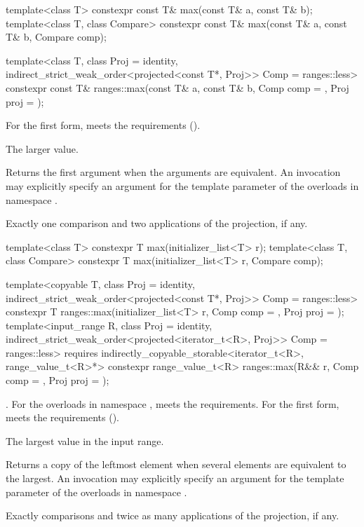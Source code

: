 %
\begin{itemdecl}
template<class T>
  constexpr const T& max(const T& a, const T& b);
template<class T, class Compare>
  constexpr const T& max(const T& a, const T& b, Compare comp);

template<class T, class Proj = identity,
         indirect_strict_weak_order<projected<const T*, Proj>> Comp = ranges::less>
  constexpr const T& ranges::max(const T& a, const T& b, Comp comp = {}, Proj proj = {});
\end{itemdecl}

\begin{itemdescr}
\pnum
\expects
For the first form,  meets the
 requirements ().

\pnum
\returns
The larger value.

\pnum
\remarks
Returns the first argument when the arguments are equivalent.
An invocation may explicitly specify
an argument for the template parameter 
of the overloads in namespace .

\pnum
\complexity
Exactly one comparison and two applications of the projection, if any.
\end{itemdescr}

%
\begin{itemdecl}
template<class T>
  constexpr T max(initializer_list<T> r);
template<class T, class Compare>
  constexpr T max(initializer_list<T> r, Compare comp);

template<copyable T, class Proj = identity,
         indirect_strict_weak_order<projected<const T*, Proj>> Comp = ranges::less>
  constexpr T ranges::max(initializer_list<T> r, Comp comp = {}, Proj proj = {});
template<input_range R, class Proj = identity,
         indirect_strict_weak_order<projected<iterator_t<R>, Proj>> Comp = ranges::less>
  requires indirectly_copyable_storable<iterator_t<R>, range_value_t<R>*>
  constexpr range_value_t<R>
    ranges::max(R&& r, Comp comp = {}, Proj proj = {});
\end{itemdecl}

\begin{itemdescr}
\pnum
\expects
{}.
For the overloads in namespace ,
 meets the  requirements.
For the first form,  meets the 
requirements ().

\pnum
\returns
The largest value in the input range.

\pnum
\remarks
Returns a copy of the leftmost element
when several elements are equivalent to the largest.
An invocation may explicitly specify
an argument for the template parameter 
of the overloads in namespace .

\pnum
\complexity
Exactly  comparisons
and twice as many applications of the projection, if any.
\end{itemdescr}

